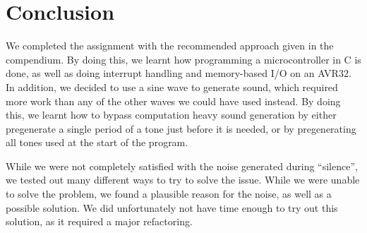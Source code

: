 \section{Conclusion}

We completed the assignment with the recommended approach given in the
compendium. By doing this, we learnt how programming a microcontroller
in C is done, as well as doing interrupt handling and memory-based I/O
on an AVR32. In addition, we decided to use a sine wave to generate
sound, which required more work than any of the other waves we could
have used instead. By doing this, we learnt how to bypass computation
heavy sound generation by either pregenerate a single period of a tone
just before it is needed, or by pregenerating all tones used at the
start of the program. 

While we were not completely satisfied with the noise generated during
``silence'', we tested out many different ways to try to solve the issue.
While we were unable to solve the problem, we found a plausible reason
for the noise, as well as a possible solution. We did unfortunately not
have time enough to try out this solution, as it required a major
refactoring.
